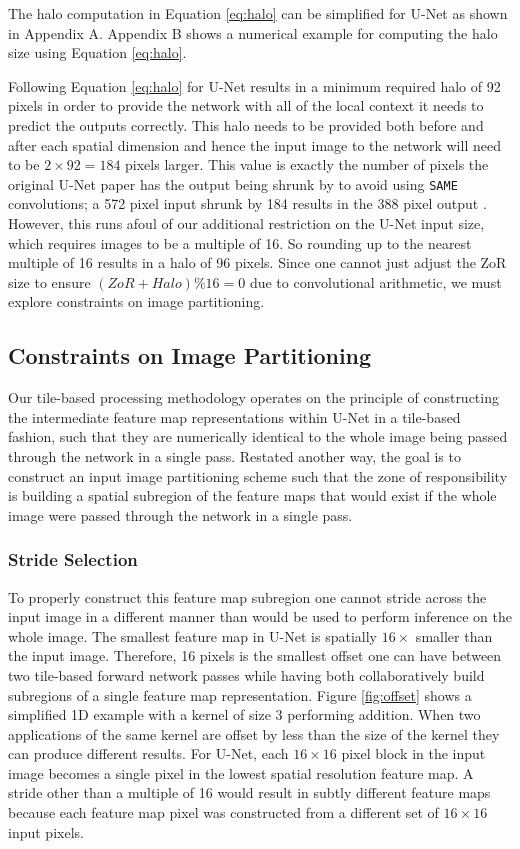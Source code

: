 \documentclass[10pt, indentfirst]{article}
\begin{document}
The halo computation in Equation \ref{eq:halo} can be simplified for U-Net as shown in Appendix A. Appendix B shows a numerical example for computing the halo size using Equation \ref{eq:halo}.

Following Equation \ref{eq:halo} for U-Net results in a minimum required halo of 92 pixels in order to provide the network with all of the local context it needs to predict the outputs correctly. This halo needs to be provided both before and after each spatial dimension and hence the input image to the network will need to be $2 \times 92 = 184$ pixels larger. This value is exactly the number of pixels the original U-Net paper has the output being shrunk by to avoid using \texttt{SAME} convolutions; a 572 pixel input shrunk by 184 results in the 388 pixel output \citep{Ronneberger2015a}. 
However, this runs afoul of our additional restriction on the U-Net input size, which requires images to be a multiple of 16. So rounding up to the nearest multiple of 16 results in a halo of 96 pixels. Since  one cannot just adjust the ZoR size to ensure $(ZoR + Halo) \% 16 = 0$ due to convolutional arithmetic, we must explore constraints on image partitioning. 

\subsection{Constraints on Image Partitioning}

Our tile-based processing methodology operates on the principle of constructing the intermediate feature map representations within U-Net in a tile-based fashion, such that they are numerically identical to the whole image being passed through the network in a single pass. Restated another way, the goal is to construct an input image partitioning scheme such that the zone of responsibility is building a spatial subregion of the feature maps that would exist if the whole image were passed through the network in a single pass. 

\subsubsection{Stride Selection}
To properly construct this feature map subregion one cannot stride across the input image in a different manner than would be used to perform inference on the whole image. The smallest feature map in U-Net is spatially $16 \times$ smaller than the input image. Therefore, 16 pixels is the smallest offset one can have between two tile-based forward network passes while having both collaboratively build subregions of a single feature map representation. Figure \ref{fig:offset} shows a simplified 1D example with a kernel of size 3 performing addition. When two applications of the same kernel are offset by less than the size of the kernel they can produce different results. 
For U-Net, each $16 \times 16$ pixel block in the input image becomes a single pixel in the lowest spatial resolution feature map. A stride other than a multiple of 16 would result in subtly different feature maps because each feature map pixel was constructed from a different set of $16 \times 16$ input pixels. 
\end{document}
